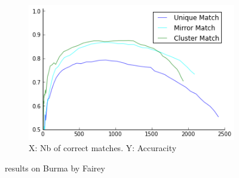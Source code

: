 \documentclass{article}
\begin{document}
\begin{figure}
{		~ %
		\begin{subfigure}[t]{0.35\textwidth}
			\centering
			\includegraphics[width=\textwidth]{images/result_fairey_burma}
			\caption{X: Nb of correct matches. Y: Accuracity}
			\label{fig:result_burma}
		\end{subfigure}%
	}%
	\label{fig:burma}
	\caption{results on Burma by Fairey}
\end{figure}
\end{document}
